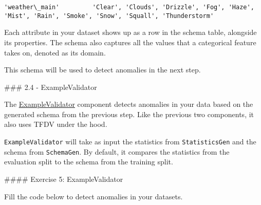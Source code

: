 \documentclass[11pt]{article}
\begin{document}
\begin{Verbatim}[commandchars=\\\{\}]
'weather\_main'         'Clear', 'Clouds', 'Drizzle', 'Fog', 'Haze', 'Mist', 'Rain', 'Smoke', 'Snow', 'Squall', 'Thunderstorm'                                                                                                                                                                                                                                                                                                                                                                                                                                                                                                                                                                                                                                                                      
    \end{Verbatim}

    
    Each attribute in your dataset shows up as a row in the schema table,
alongside its properties. The schema also captures all the values that a
categorical feature takes on, denoted as its domain.

This schema will be used to detect anomalies in the next step.

    \#\#\# 2.4 - ExampleValidator

The
\href{https://www.tensorflow.org/tfx/guide/exampleval}{ExampleValidator}
component detects anomalies in your data based on the generated schema
from the previous step. Like the previous two components, it also uses
TFDV under the hood.

\texttt{ExampleValidator} will take as input the statistics from
\texttt{StatisticsGen} and the schema from \texttt{SchemaGen}. By
default, it compares the statistics from the evaluation split to the
schema from the training split.

    \#\#\#\# Exercise 5: ExampleValidator

Fill the code below to detect anomalies in your datasets.
\end{document}
